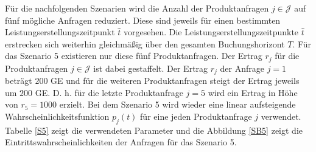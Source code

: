 Für die nachfolgenden Szenarien wird die Anzahl der Produktanfragen $j\in\mathcal{J}$ auf fünf mögliche Anfragen reduziert. Diese sind jeweils für einen bestimmten Leistungserstellungszeitpunkt $\hat t$ vorgesehen. Die Leistungserstellungszeitpunkte $\hat t$ erstrecken sich weiterhin gleichmäßig über den gesamten Buchungshorizont $T$. Für das Szenario 5 existieren nur diese fünf Produktanfragen. Der Ertrag $r_j$ für die Produktanfragen $j\in\mathcal{J}$ ist dabei gestaffelt. Der Ertrag $r_j$ der Anfrage $j=1$ beträgt $200$ GE und für die weiteren Produktanfragen steigt der Ertrag jeweils um $200$ GE. D. h. für die letzte Produktanfrage $j=5$ wird ein Ertrag in Höhe von $r_5=1000$ erzielt. Bei dem Szenario 5 wird wieder eine linear aufsteigende Wahrscheinlichkeitsfunktion $p_j(t)$ für eine jeden Produktanfrage $j$ verwendet. Tabelle \ref{S5} zeigt die verwendeten Parameter und die Abbildung \ref{SB5} zeigt die Eintrittswahrscheinlichkeiten der Anfragen für das Szenario 5.\\

